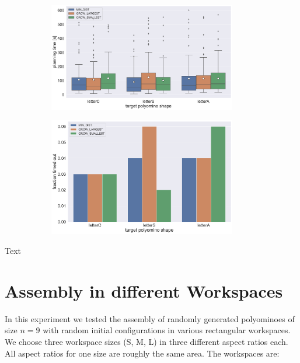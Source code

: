 \begin{figure}
	\centering
	\begin{subfigure}[b]{\textwidth}
		\centering
		\includegraphics[width=0.9\textwidth]{figures/plots/AFTS_sp_time.pdf}
		\caption{}
		\label{fig:AFTS_sp_time}
	\end{subfigure}
	
	\begin{subfigure}[b]{\textwidth}
		\centering
		\includegraphics[width=0.9\textwidth]{figures/plots/AFTS_sp_timeout.pdf}
		\caption{}
		\label{fig:AFTS_sp_timeout}
	\end{subfigure}
	\caption[]{}
	\label{fig:AFTS_sp_timestats}
\end{figure}

Text




\section{Assembly in different Workspaces}
\label{sec:AFBS}

In this experiment we tested the assembly of randomly generated polyominoes of size $n=9$ with random initial configurations in various rectangular workspaces.
We choose three workspace sizes (S, M, L) in three different aspect ratios each.
All aspect ratios for one size are roughly the same area. The workspaces are:

